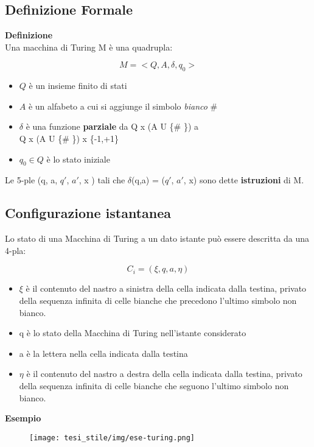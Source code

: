 \subsection{Definizione Formale}
\textbf{Definizione}\\
Una macchina di Turing M è una quadrupla:
\begin{center}
    $$M=<Q,A,\delta,q_0>$$
\end{center}
\begin{itemize}
    \item $Q$ è un insieme finito di stati
    \item $A$ è un alfabeto a cui si aggiunge il simbolo \textit{bianco} \#
    \item $\delta$ è una funzione \textbf{parziale} da Q x (A U \{\# \}) a \\
    Q x (A U \{\# \}) x \{-1,+1\}
    \item $q_0 \in Q$ è lo stato iniziale
\end{itemize}
Le 5-ple (q, a, $q'$, $a'$, x ) tali che $\delta$(q,a) = ($q'$, $a'$, x) sono dette \textbf{istruzioni} di M.
\subsection{Configurazione istantanea}
Lo stato di una Macchina di Turing a un dato istante può essere descritta da una 4-pla:
\begin{center}
   $$C_i = (\xi,q,a,\eta)$$ 
\end{center}
\begin{itemize}
    \item $\xi$ è il contenuto del nastro a sinistra della cella indicata dalla testina, privato della sequenza infinita di celle bianche che precedono l’ultimo simbolo non bianco.
    
    \item q è lo stato della Macchina di Turing nell’istante considerato
    
    \item a è la lettera nella cella indicata dalla testina
    
    \item $\eta$ è il contenuto del nastro a destra della cella indicata dalla testina, privato della sequenza infinita di celle bianche che seguono l’ultimo simbolo non bianco.
\end{itemize}
\textbf{Esempio}
\vspace{0.2cm}
\begin{figure}[htp]
    \centering
     \texttt{[image: tesi\_stile/img/ese-turing.png]}
\end{figure}
\newpage
